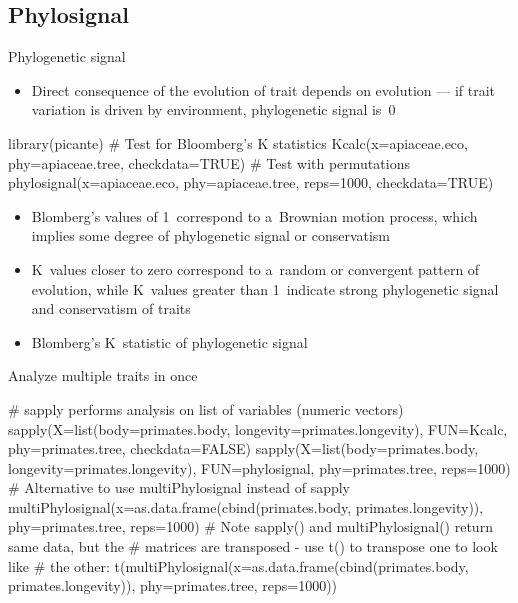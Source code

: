 \documentclass[compress, ucs, xelatex, 11pt, xcolor=svgnames, aspectratio=169,
	hyperref={
		bookmarks=true,
		unicode=true,
		colorlinks=true,
		pdftitle={Molecular data in R},
		plainpages=false,
		pdfauthor={Vojtech Zeisek},
		pdfsubject={Course about phylogeny and evolution in R},
		pdfcreator={XeLaTeX},
		pdfkeywords={R, evolution, phylogeny, molecular data},
		linkcolor=Crimson, %
		anchorcolor=Magenta, %
		citecolor=Magenta, %
		filecolor=Magenta, %
		menucolor=Magenta, %
		urlcolor=DodgerBlue, %
		pdftex},
	url={hyphens, lowtilde} %
	]{beamer}
\begin{document}
\subsection{Phylosignal}

\begin{frame}[fragile]{Phylogenetic signal}
	\begin{itemize}
		\item Direct consequence of the evolution of trait depends on evolution --- if trait variation is driven by environment, phylogenetic signal is~0
	\end{itemize}
	\begin{spluscode}
    library(picante)
    # Test for Bloomberg's K statistics
    Kcalc(x=apiaceae.eco, phy=apiaceae.tree, checkdata=TRUE)
    # Test with permutations
    phylosignal(x=apiaceae.eco, phy=apiaceae.tree, reps=1000,
      checkdata=TRUE)
	\end{spluscode}
	\begin{itemize}
		\item Blomberg's values of 1~correspond to a~Brownian motion process, which implies some degree of phylogenetic signal or conservatism
		\item K~values closer to zero correspond to a~random or convergent pattern of evolution, while K~values greater than 1~indicate strong phylogenetic signal and conservatism of traits
		\item Blomberg's K~statistic of phylogenetic signal
	\end{itemize}
\end{frame}

\begin{frame}[fragile]{Analyze multiple traits in once}
	\begin{spluscode}
    # sapply performs analysis on list of variables (numeric vectors)
    sapply(X=list(body=primates.body, longevity=primates.longevity),
      FUN=Kcalc, phy=primates.tree, checkdata=FALSE)
    sapply(X=list(body=primates.body, longevity=primates.longevity),
      FUN=phylosignal, phy=primates.tree, reps=1000)
    # Alternative to use multiPhylosignal instead of sapply
    multiPhylosignal(x=as.data.frame(cbind(primates.body,
      primates.longevity)), phy=primates.tree, reps=1000)
    # Note sapply() and multiPhylosignal() return same data, but the
    # matrices are transposed - use t() to transpose one to look like
    # the other:
    t(multiPhylosignal(x=as.data.frame(cbind(primates.body,
      primates.longevity)), phy=primates.tree, reps=1000))
	\end{spluscode}
\end{frame}
\end{document}
